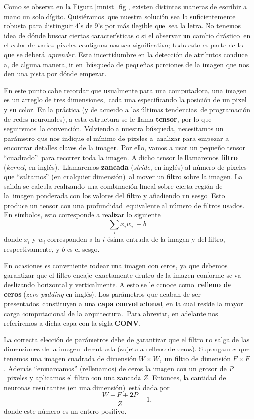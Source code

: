 Como se observa en la Figura \ref{mnist_fig}, existen distintas maneras de escribir a mano un solo dígito. Quisiéramos\
que nuestra solución sea lo suficientemente robusta para distinguir $4$'s de $9$'s por más ilegible que\
sea la letra. No tenemos idea de dónde buscar ciertas características o si el observar un cambio drástico\
en el color de varios pixeles contiguos nos sea significativo; todo esto es parte de lo que se deberá\
\emph{aprender}. Esta incertidumbre en la detección de atributos conduce a, de alguna manera, ir en\
búsqueda de pequeñas porciones de la imagen que nos den una pista por dónde empezar.\par
En este punto cabe recordar que usualmente para una computadora, una imagen es un arreglo de tres dimensiones,\
cada una especificando la posición de un pixel y su color. En la práctica (y de acuerdo a las últimas tendencias\
de programación de redes neuronales), a esta estructura se le llama \textbf{tensor}, por lo que seguiremos\
la convención. Volviendo a nuestra búsqueda, necesitamos un parámetro que nos indique el mínimo de pixeles a\
analizar para empezar a encontrar detalles claves de la imagen. Por ello, vamos a usar un pequeño tensor ``cuadrado''\
para recorrer toda la imagen. A dicho tensor le llamaremos \textbf{filtro} (\emph{kernel}, en inglés).\
Llamaremos \textbf{zancada} (\emph{stride}, en inglés) al número de pixeles que ``saltamos'' (en cualquier dimensión)\
al mover un filtro sobre la imagen. La salida se calcula realizando una combinación lineal sobre cierta región de la\
imagen ponderada con los valores del filtro y añadiendo un sesgo. Esto produce un tensor con una profundidad\
equivalente al número de filtros usados. En símbolos, esto corresponde a realizar lo siguiente
\begin{equation} \label{entry-wise-sum}
  \sum _{i} x_i w_i\ + b
\end{equation}
donde $x_i$ y $w_i$ corresponden a la $i$-ésima entrada de la imagen y del filtro, respectivamente, y $b$ es el sesgo.\par
En ocasiones es conveniente rodear una imagen con ceros, ya que debemos garantizar que el filtro encaje\
exactamente dentro de la imagen conforme se va deslizando horizontal y verticalmente. A esto se le conoce como\
\textbf{relleno de ceros} (\emph{zero-padding} en inglés). Los parámetros que acaban de ser presentados\
constituyen a una \textbf{capa convolucional}, en la cual reside la mayor carga computacional de la arquitectura.\
Para abreviar, en adelante nos referiremos a dicha capa con la sigla \textbf{CONV}.\par
La correcta elección de parámetros debe de garantizar que el filtro no salga de las dimensiones de la imagen\
de entrada (sujeta a relleno de ceros). Supongamos que tenemos una imagen cuadrada de dimensión $W \times W$,\
un filtro de dimensión $F \times F$. Además ``enmarcamos'' (rellenamos) de ceros la imagen con un grosor de $P$\
pixeles y aplicamos el filtro con una zancada $Z$. Entonces, la cantidad de neuronas resultantes (en una dimensión)\
está dada por
\begin{equation}
  \frac{W - F + 2P}{Z} + 1,
\end{equation}
donde este número es un entero positivo.

